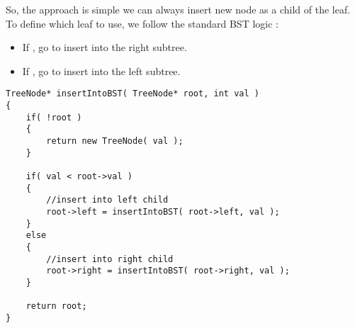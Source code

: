 So, the approach is simple we can always insert new node as a child of the leaf. To define which leaf to use, we follow the standard BST logic :


\begin{itemize}
\item If , go to insert into the right subtree.
\item If , go to insert into the left subtree.
\end{itemize}

\setcounter{lstlisting}{0}
\begin{lstlisting}[style=customc, caption={Recursion}]
TreeNode* insertIntoBST( TreeNode* root, int val )
{
    if( !root )
    {
        return new TreeNode( val );
    }

    if( val < root->val )
    {
		//insert into left child
        root->left = insertIntoBST( root->left, val );
    }
    else
    {
		//insert into right child
        root->right = insertIntoBST( root->right, val );
    }

    return root;
}
\end{lstlisting}



